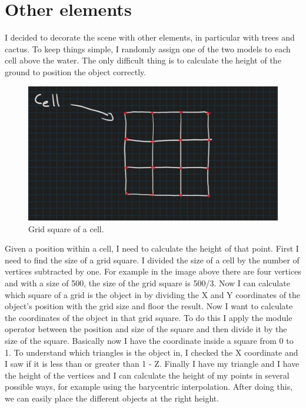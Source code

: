 \newpage

\section{Other elements}
I decided to decorate the scene with other elements, in particular with trees and cactus. To keep things simple, I randomly assign one of the two models to each cell above the water. The only difficult thing is to calculate the height of the ground to position the object correctly.

\begin{figure}[hbt!]
	\centering
	\includegraphics[width= 0.75
	\textwidth]{images/object.jpg}
	\caption{Grid square of a cell.}
\end{figure}

\noindent
Given a position within a cell, I need to calculate the height of that point. First I need to find the size of a grid square. I divided the size of a cell by the number of vertices subtracted by one. For example in the image above there are four vertices and with a size of 500, the size of the grid square is 500/3. Now I can calculate which square of a grid is the object in by dividing the X and Y coordinates of the object's position with the grid size and floor the result. Now I want to calculate the coordinates of the object in that grid square. To do this I apply the module operator between the position and size of the square and then divide it by the size of the square. Basically now I have the coordinate inside a square from 0 to 1. To understand which triangles is the object in, I checked the X coordinate and I saw if it is less than or greater than 1 - Z. Finally I have my triangle and I have the height of the vertices and I can calculate the height of my points in several possible ways, for example using the barycentric interpolation.
After doing this, we can easily place the different objects at the right height.

\newpage

